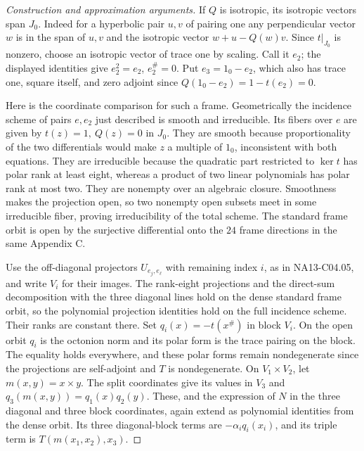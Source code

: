 \documentclass[11pt,a4paper,openany,oneside]{book}
\theoremstyle{resultstyle}
\theoremstyle{definition}
\numberwithin{equation}{chapter}
\begin{document}
\begin{proof}[Construction and approximation arguments]
If \(Q\) is isotropic, its isotropic vectors
span \(J_0\). Indeed for a hyperbolic pair
\(u,v\) of pairing one any perpendicular vector
\(w\) is in the span of \(u,v\) and the
isotropic vector \(w+u-Q(w)v\).
Since \(t|_{J_0}\) is nonzero, choose
an isotropic vector of trace one by scaling.
Call it \(e_2\); the displayed identities
give \(e_2^2=e_2\), \(e_2^\#=0\). Put
\(e_3=1_0-e_2\), which also has trace one,
square itself, and zero adjoint since
\(Q(1_0-e_2)=1-t(e_2)=0\).

Here is the coordinate comparison for such a
frame. Geometrically the incidence scheme
of pairs \(e,e_2\) just described is smooth
and irreducible. Its fibers over \(e\) are
given by \(t(z)=1,\ Q(z)=0\) in \(J_0\).
They are smooth because proportionality of
the two differentials would make \(z\) a
multiple of \(1_0\), inconsistent with both
equations. They are irreducible because the
quadratic part restricted to \(\ker t\)
has polar rank at least eight, whereas a
product of two linear polynomials has polar
rank at most two. They are nonempty over
an algebraic closure. Smoothness makes the
projection open, so two nonempty open
subsets meet in some irreducible fiber,
proving irreducibility of the total scheme.
The standard frame orbit is open by the
surjective differential onto the \(24\)
frame directions in the same Appendix C.

Use the off-diagonal projectors
\(U_{e_j,e_\ell}\) with remaining index \(i\),
as in NA13-C04.05, and write \(V_i\) for
their images. The rank-eight projections
and the direct-sum decomposition with
the three diagonal lines hold on the
dense standard frame orbit, so the
polynomial projection identities hold
on the full incidence scheme. Their
ranks are constant there. Set
\(q_i(x)=-t(x^\#)\) in block \(V_i\).
On the open orbit \(q_i\) is the
octonion norm and its polar form is
the trace pairing on the block.
The equality holds everywhere, and
these polar forms remain nondegenerate
since the projections are self-adjoint
and \(T\) is nondegenerate.
On \(V_1\times V_2\), let \(m(x,y)=x\times y\).
The split coordinates give its values
in \(V_3\) and
\(q_3(m(x,y))=q_1(x)q_2(y)\).
These, and the expression of \(N\) in
the three diagonal and three block
coordinates, again extend as polynomial
identities from the dense orbit. Its
three diagonal-block terms are
\(-\alpha_i q_i(x_i)\), and its
triple term is \(T(m(x_1,x_2),x_3)\).


\end{proof}
\end{document}
